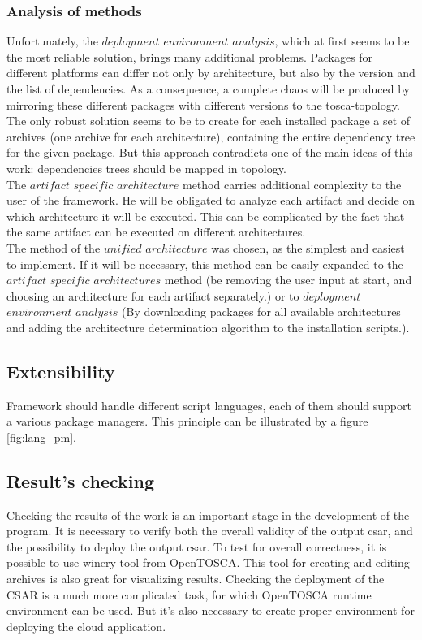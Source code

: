 \subsubsection*{Analysis of methods}
Unfortunately, the $deployment$ $environment$ $analysis$, which at first seems to be the most reliable solution, brings many additional problems.
Packages for different platforms can differ not only by architecture, but also by the version and the list of dependencies.
As a consequence, a complete chaos will be produced by mirroring these different packages with different versions to the \gls{tosca}-topology.
The only robust solution seems to be to create for each installed package a set of archives (one archive for each architecture), containing the entire dependency tree for the given package.
But this approach contradicts one of the main ideas of this work: dependencies trees should be mapped in topology.\\
The $artifact$ $specific$ $architecture$ method carries additional complexity to the user of the framework.
He will be obligated to analyze each artifact and decide on which architecture it will be executed. 
This can be complicated by the fact that the same artifact can be executed on different architectures.\\
The method of the $unified$ $architecture$ was chosen, as the simplest and easiest to implement.
If it will be necessary, this method can be easily expanded to the $artifact$ $specific$ $architectures$ method (be removing the user input at start, and choosing an architecture for each artifact separately.) or to $deployment$ $environment$ $analysis$ (By downloading packages for all available architectures and adding the architecture determination algorithm to the installation scripts.).

\subsection{Extensibility}
Framework should handle different script languages, each of them should support a various package managers.
This principle can be illustrated by a figure \ref{fig:lang_pm}.


\subsection{Result's checking}
Checking the results of the work is an important stage in the development of the program.
It is necessary to verify both the overall validity of the output \gls{csar}, and the possibility to deploy the output \gls{csar}.
To test for overall correctness, it is possible to use winery tool from OpenTOSCA.
This tool for creating and editing archives is also great for visualizing results.
Checking the deployment of the CSAR is a much more complicated task, for which OpenTOSCA runtime environment can be used. 
But it's also necessary to create proper environment for deploying the cloud application.

